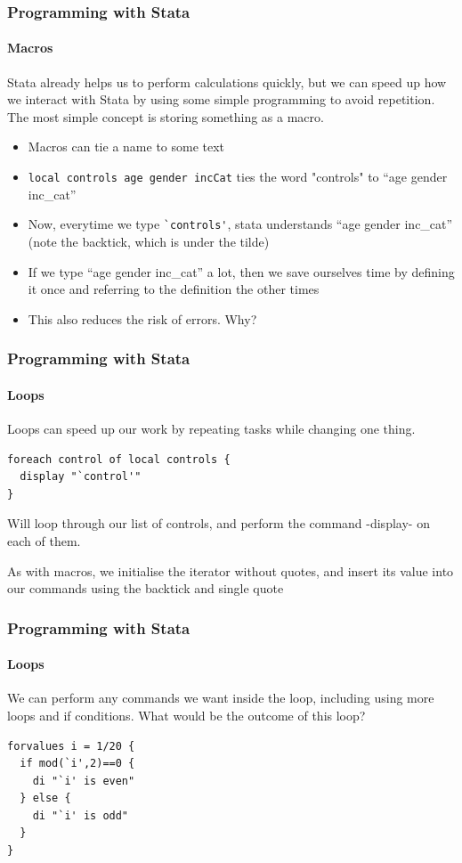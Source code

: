 \documentclass{beamer}
\begin{document}
\begin{frame}[fragile]
  \frametitle{Programming with Stata}
  \framesubtitle{Macros}
  Stata already helps us to perform calculations quickly, but we can speed up how we interact with Stata by using some simple programming to avoid repetition.  The most simple concept is storing something as a macro.
  \begin{itemize}
    \item Macros can tie a name to some text 
    \item \verb|local controls age gender incCat| ties the word "controls" to ``age gender inc\_cat''
    \item Now, everytime we type  \verb|`controls'|, stata understands ``age gender inc\_cat'' (note the backtick, which is under the tilde)
    \item If we type ``age gender inc\_cat'' a lot, then we save ourselves time by defining it once and referring to the definition the other times
    \item This also reduces the risk of errors. Why?
  \end{itemize}
\end{frame}

\begin{frame}[fragile]
  \frametitle{Programming with Stata}
  \framesubtitle{Loops}
  Loops can speed up our work by repeating tasks while changing one thing. 
  \begin{verbatim}
foreach control of local controls {
  display "`control'"
}
  \end{verbatim}
  Will loop through our list of controls, and perform the command -display- on each of them.

\smallskip

As with macros, we initialise the iterator without quotes, and insert its value into our commands using the backtick and single quote
\end{frame}

\begin{frame}[fragile]
  \frametitle{Programming with Stata}
  \framesubtitle{Loops}

 We can perform any commands we want inside the loop, including using more loops and if conditions.
What would be the outcome of this loop?
  \begin{verbatim}
forvalues i = 1/20 {
  if mod(`i',2)==0 {
    di "`i' is even"
  } else {
    di "`i' is odd"
  }
}
  \end{verbatim}

\end{frame}
\end{document}

